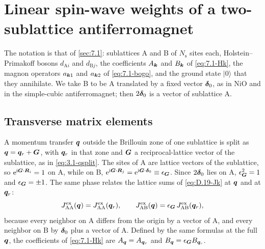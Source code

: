 \section[Spin weights of an antiferromagnet]{Linear spin-wave weights of a two-sublattice antiferromagnet}\label{app:D.38}

The notation is that of \cref{sec:7.1}: sublattices A and B of $N_{\mathrm{s}}$ sites each, Holstein--Primakoff bosons $d_{\mathrm{A}i}$ and $d_{\mathrm{B}j}$, the coefficients $A_{\bm{k}}$ and $B_{\bm{k}}$ of \cref{eq:7.1-Hk}, the magnon operators $a_{\bm{k}1}$ and $a_{\bm{k}2}$ of \cref{eq:7.1-bogo}, and the ground state $|0\rangle$ that they annihilate. We take B to be A translated by a fixed vector $\bm{\delta}_0$, as in NiO and in the simple-cubic antiferromagnet; then $2\bm{\delta}_0$ is a vector of sublattice A.

\subsection*{Transverse matrix elements}

A momentum transfer $\bm{q}$ outside the Brillouin zone of one sublattice is split as $\bm{q} = \bm{q}_r + \bm{G}$, with $\bm{q}_r$ in that zone and $\bm{G}$ a reciprocal-lattice vector of the sublattice, as in \cref{eq:3.1-qsplit}. The sites of A are lattice vectors of the sublattice, so $\mathrm{e}^{\mathrm{i}\bm{G}\cdot\bm{R}_i} = 1$ on A, while on B, $\mathrm{e}^{\mathrm{i}\bm{G}\cdot\bm{R}_j} = \mathrm{e}^{\mathrm{i}\bm{G}\cdot\bm{\delta}_0} \equiv \epsilon_{\bm{G}}$. Since $2\bm{\delta}_0$ lies on A, $\epsilon_{\bm{G}}^2 = 1$ and $\epsilon_{\bm{G}} = \pm1$. The same phase relates the lattice sums of \cref{eq:D.19-Jk} at $\bm{q}$ and at $\bm{q}_r$:
\begin{equation*}
  J^{\mathrm{ex}}_{\mathrm{AA}}(\bm{q}) = J^{\mathrm{ex}}_{\mathrm{AA}}(\bm{q}_r), \qquad J^{\mathrm{ex}}_{\mathrm{AB}}(\bm{q}) = \epsilon_{\bm{G}}\,J^{\mathrm{ex}}_{\mathrm{AB}}(\bm{q}_r) ,
\end{equation*}
because every neighbor on A differs from the origin by a vector of A, and every neighbor on B by $\bm{\delta}_0$ plus a vector of A. Defined by the same formulas at the full $\bm{q}$, the coefficients of \cref{eq:7.1-Hk} are $A_{\bm{q}} = A_{\bm{q}_r}$ and $B_{\bm{q}} = \epsilon_{\bm{G}}B_{\bm{q}_r}$.

